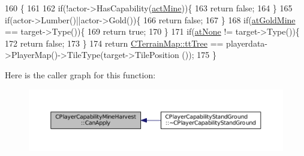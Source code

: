 \begin{DoxyCode}
160                                                                                                            
                                                        \{
161     
162     \textcolor{keywordflow}{if}(!actor->HasCapability(\hyperlink{GameDataTypes_8h_a35b98ce26aca678b03c6f9f76e4778cea2e0db284fd05caa56e3867c661ccdd8b}{actMine}))\{
163         \textcolor{keywordflow}{return} \textcolor{keyword}{false};
164     \}
165     \textcolor{keywordflow}{if}(actor->Lumber()||actor->Gold())\{
166         \textcolor{keywordflow}{return} \textcolor{keyword}{false};
167     \}
168     \textcolor{keywordflow}{if}(\hyperlink{GameDataTypes_8h_a5600d4fc433b83300308921974477feca243d9ba44092eadd561db058d742b3b3}{atGoldMine} == target->Type())\{
169         \textcolor{keywordflow}{return} \textcolor{keyword}{true};
170     \}
171     \textcolor{keywordflow}{if}(\hyperlink{GameDataTypes_8h_a5600d4fc433b83300308921974477feca82fb51718e2c00981a2d37bc6fe92593}{atNone} != target->Type())\{
172         \textcolor{keywordflow}{return} \textcolor{keyword}{false};
173     \}
174     \textcolor{keywordflow}{return} \hyperlink{classCTerrainMap_aff2ab991e237269941416dd79d8871d4a15600fc22dc08ff5a3aec20930112f8c}{CTerrainMap::ttTree} == playerdata->PlayerMap()->TileType(target->TilePosition
      ());
175 \}
\end{DoxyCode}
Here is the caller graph for this function\+:
\nopagebreak
\begin{figure}[H]
\begin{center}
\leavevmode
\includegraphics[width=350pt]{classCPlayerCapabilityMineHarvest_a31da799cc9bc9be9f986bd878d13283a_icgraph}
\end{center}
\end{figure}
\hypertarget{classCPlayerCapabilityMineHarvest_a37944eb249559f1246348b47e3f24dee}{}\label{classCPlayerCapabilityMineHarvest_a37944eb249559f1246348b47e3f24dee} 
